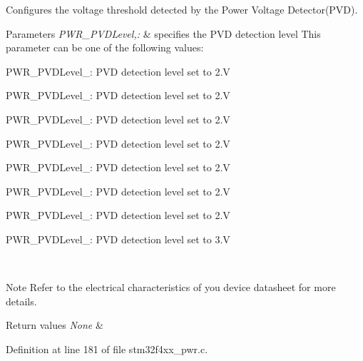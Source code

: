 Configures the voltage threshold detected by the Power Voltage Detector(\-P\-V\-D). 


\begin{DoxyParams}{Parameters}
{\em P\-W\-R\-\_\-\-P\-V\-D\-Level,\-:} & specifies the P\-V\-D detection level This parameter can be one of the following values\-: \begin{DoxyItemize}
\item P\-W\-R\-\_\-\-P\-V\-D\-Level\-\_\-: P\-V\-D detection level set to 2.\-V \item P\-W\-R\-\_\-\-P\-V\-D\-Level\-\_\-: P\-V\-D detection level set to 2.\-V \item P\-W\-R\-\_\-\-P\-V\-D\-Level\-\_\-: P\-V\-D detection level set to 2.\-V \item P\-W\-R\-\_\-\-P\-V\-D\-Level\-\_\-: P\-V\-D detection level set to 2.\-V \item P\-W\-R\-\_\-\-P\-V\-D\-Level\-\_\-: P\-V\-D detection level set to 2.\-V \item P\-W\-R\-\_\-\-P\-V\-D\-Level\-\_\-: P\-V\-D detection level set to 2.\-V \item P\-W\-R\-\_\-\-P\-V\-D\-Level\-\_\-: P\-V\-D detection level set to 2.\-V \item P\-W\-R\-\_\-\-P\-V\-D\-Level\-\_\-: P\-V\-D detection level set to 3.\-V \end{DoxyItemize}
\\
\hline
\end{DoxyParams}
\begin{DoxyNote}{Note}
Refer to the electrical characteristics of you device datasheet for more details. 
\end{DoxyNote}

\begin{DoxyRetVals}{Return values}
{\em None} & \\
\hline
\end{DoxyRetVals}


Definition at line 181 of file stm32f4xx\-\_\-pwr.\-c.

